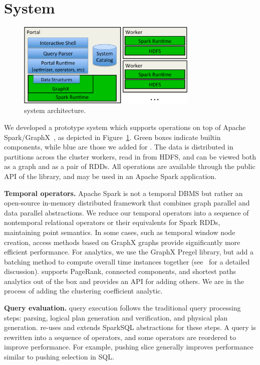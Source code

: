 \section{System}
\label{sec:sys}

\begin{figure}[t]
\centering
\includegraphics[width=3.4in]{figs/architecture.pdf}
\vspace{-0.4cm}
\caption{\sys system architecture.}
\vspace{-0.4cm}
\label{fig:arch}
\end{figure}

We developed a prototype system \sys which supports \tga operations on
top of Apache Spark/GraphX~\cite{DBLP:conf/osdi/GonzalezXDCFS14}, as
depicted in Figure~\ref{fig:arch}.  Green boxes indicate builtin
components, while blue are those we added for \sys.  The data is
distributed in partitions across the cluster workers, read in from
HDFS, and can be viewed both as a graph and as a pair of RDDs.  All
\tg operations are available through the public API of the \sys
library, and may be used in an Apache Spark application.

{\bf Temporal operators.}  Apache Spark is not a temporal DBMS but
rather an open-source in-memory distributed framework that combines
graph parallel and data parallel abstractions.  We reduce our temporal
operators into a sequence of nontemporal relational operators or their
equivalents for Spark RDDs, maintaining point semantics.  In some
cases, such as temporal window node creation, access methods based on
GraphX graphs provide significantly more efficient performance.  For
analytics, we use the GraphX Pregel library, but add a batching method
to compute overall time instances together
(see~\cite{MoffittTempWeb16} for a detailed discussion).  \sys
supports PageRank, connected components, and shortest paths analytics
out of the box and provides an API for adding others.  We are in the
process of adding the clustering coefficient analytic.

{\bf Query evaluation.}  \sys query execution follows the traditional
query processing steps: parsing, logical plan generation and
verification, and physical plan generation. \sys re-uses and extends
SparkSQL abstractions for these steps.  A \ql query is rewritten into
a sequence of operators, and some operators are reordered to improve
performance.  For example, pushing slice generally improves
performance similar to pushing selection in SQL.

